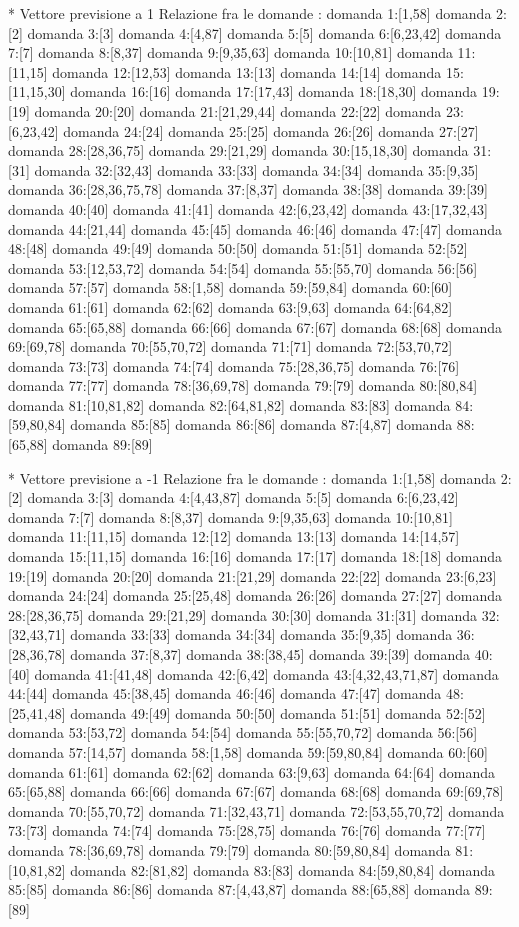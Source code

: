 * Vettore previsione a 1
Relazione fra le domande :
domanda 1:[1,58]
domanda 2:[2]
domanda 3:[3]
domanda 4:[4,87]
domanda 5:[5]
domanda 6:[6,23,42]
domanda 7:[7]
domanda 8:[8,37]
domanda 9:[9,35,63]
domanda 10:[10,81]
domanda 11:[11,15]
domanda 12:[12,53]
domanda 13:[13]
domanda 14:[14]
domanda 15:[11,15,30]
domanda 16:[16]
domanda 17:[17,43]
domanda 18:[18,30]
domanda 19:[19]
domanda 20:[20]
domanda 21:[21,29,44]
domanda 22:[22]
domanda 23:[6,23,42]
domanda 24:[24]
domanda 25:[25]
domanda 26:[26]
domanda 27:[27]
domanda 28:[28,36,75]
domanda 29:[21,29]
domanda 30:[15,18,30]
domanda 31:[31]
domanda 32:[32,43]
domanda 33:[33]
domanda 34:[34]
domanda 35:[9,35]
domanda 36:[28,36,75,78]
domanda 37:[8,37]
domanda 38:[38]
domanda 39:[39]
domanda 40:[40]
domanda 41:[41]
domanda 42:[6,23,42]
domanda 43:[17,32,43]
domanda 44:[21,44]
domanda 45:[45]
domanda 46:[46]
domanda 47:[47]
domanda 48:[48]
domanda 49:[49]
domanda 50:[50]
domanda 51:[51]
domanda 52:[52]
domanda 53:[12,53,72]
domanda 54:[54]
domanda 55:[55,70]
domanda 56:[56]
domanda 57:[57]
domanda 58:[1,58]
domanda 59:[59,84]
domanda 60:[60]
domanda 61:[61]
domanda 62:[62]
domanda 63:[9,63]
domanda 64:[64,82]
domanda 65:[65,88]
domanda 66:[66]
domanda 67:[67]
domanda 68:[68]
domanda 69:[69,78]
domanda 70:[55,70,72]
domanda 71:[71]
domanda 72:[53,70,72]
domanda 73:[73]
domanda 74:[74]
domanda 75:[28,36,75]
domanda 76:[76]
domanda 77:[77]
domanda 78:[36,69,78]
domanda 79:[79]
domanda 80:[80,84]
domanda 81:[10,81,82]
domanda 82:[64,81,82]
domanda 83:[83]
domanda 84:[59,80,84]
domanda 85:[85]
domanda 86:[86]
domanda 87:[4,87]
domanda 88:[65,88]
domanda 89:[89]

* Vettore previsione a -1
Relazione fra le domande :
domanda 1:[1,58]
domanda 2:[2]
domanda 3:[3]
domanda 4:[4,43,87]
domanda 5:[5]
domanda 6:[6,23,42]
domanda 7:[7]
domanda 8:[8,37]
domanda 9:[9,35,63]
domanda 10:[10,81]
domanda 11:[11,15]
domanda 12:[12]
domanda 13:[13]
domanda 14:[14,57]
domanda 15:[11,15]
domanda 16:[16]
domanda 17:[17]
domanda 18:[18]
domanda 19:[19]
domanda 20:[20]
domanda 21:[21,29]
domanda 22:[22]
domanda 23:[6,23]
domanda 24:[24]
domanda 25:[25,48]
domanda 26:[26]
domanda 27:[27]
domanda 28:[28,36,75]
domanda 29:[21,29]
domanda 30:[30]
domanda 31:[31]
domanda 32:[32,43,71]
domanda 33:[33]
domanda 34:[34]
domanda 35:[9,35]
domanda 36:[28,36,78]
domanda 37:[8,37]
domanda 38:[38,45]
domanda 39:[39]
domanda 40:[40]
domanda 41:[41,48]
domanda 42:[6,42]
domanda 43:[4,32,43,71,87]
domanda 44:[44]
domanda 45:[38,45]
domanda 46:[46]
domanda 47:[47]
domanda 48:[25,41,48]
domanda 49:[49]
domanda 50:[50]
domanda 51:[51]
domanda 52:[52]
domanda 53:[53,72]
domanda 54:[54]
domanda 55:[55,70,72]
domanda 56:[56]
domanda 57:[14,57]
domanda 58:[1,58]
domanda 59:[59,80,84]
domanda 60:[60]
domanda 61:[61]
domanda 62:[62]
domanda 63:[9,63]
domanda 64:[64]
domanda 65:[65,88]
domanda 66:[66]
domanda 67:[67]
domanda 68:[68]
domanda 69:[69,78]
domanda 70:[55,70,72]
domanda 71:[32,43,71]
domanda 72:[53,55,70,72]
domanda 73:[73]
domanda 74:[74]
domanda 75:[28,75]
domanda 76:[76]
domanda 77:[77]
domanda 78:[36,69,78]
domanda 79:[79]
domanda 80:[59,80,84]
domanda 81:[10,81,82]
domanda 82:[81,82]
domanda 83:[83]
domanda 84:[59,80,84]
domanda 85:[85]
domanda 86:[86]
domanda 87:[4,43,87]
domanda 88:[65,88]
domanda 89:[89]

